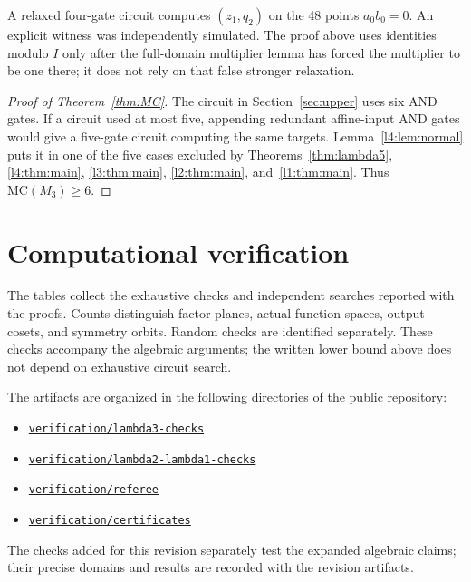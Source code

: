 \documentclass[11pt,a4paper]{article}
\theoremstyle{plain}
\theoremstyle{remark}
\begin{document}
A relaxed four-gate circuit computes $(z_1,q_2)$ on the 48 points $a_0b_0=0$. An explicit witness was independently simulated. The proof above uses identities modulo $I$ only after the full-domain multiplier lemma has forced the multiplier to be one there; it does not rely on that false stronger relaxation.


\begin{proof}[Proof of Theorem~\ref{thm:MC}]
The circuit in Section~\ref{sec:upper} uses six AND gates. If a circuit used at most five, appending redundant affine-input AND gates would give a five-gate circuit computing the same targets. Lemma~\ref{l4:lem:normal} puts it in one of the five cases excluded by Theorems~\ref{thm:lambda5}, \ref{l4:thm:main}, \ref{l3:thm:main}, \ref{l2:thm:main}, and~\ref{l1:thm:main}. Thus $\mathrm{MC}(M_3)\ge6$.
\end{proof}

\appendix
\section{Computational verification}\label{sec:verification}
The tables collect the exhaustive checks and independent searches reported with the proofs. Counts distinguish factor planes, actual function spaces, output cosets, and symmetry orbits. Random checks are identified separately. These checks accompany the algebraic arguments; the written lower bound above does not depend on exhaustive circuit search.

The artifacts are organized in the following directories of \href{https://github.com/bishara74/lowhalf-mul3}{the public repository}:
\begin{itemize}
\item \href{https://github.com/bishara74/lowhalf-mul3/tree/main/verification/lambda3-checks}{\nolinkurl{verification/lambda3-checks}}
\item
\href{https://github.com/bishara74/lowhalf-mul3/tree/main/verification/lambda2-lambda1-checks}{\nolinkurl{verification/lambda2-lambda1-checks}}
\item
\href{https://github.com/bishara74/lowhalf-mul3/tree/main/verification/referee}{\nolinkurl{verification/referee}}
\item
\href{https://github.com/bishara74/lowhalf-mul3/tree/main/verification/certificates}{\nolinkurl{verification/certificates}}
\end{itemize}
The checks added for this revision separately test the expanded algebraic claims; their precise domains and results are recorded with the revision artifacts.
\end{document}
